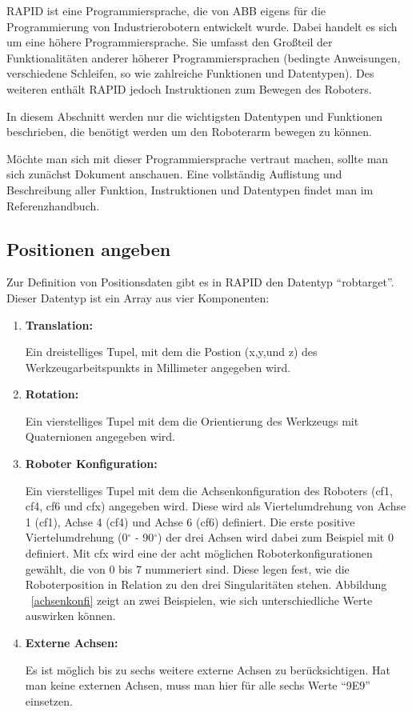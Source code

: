 RAPID ist eine Programmiersprache, die von ABB eigens für die Programmierung von Industrierobotern entwickelt wurde. Dabei handelt es sich um eine höhere Programmiersprache. Sie umfasst den Großteil der Funktionalitäten anderer höherer Programmiersprachen (bedingte Anweisungen, verschiedene Schleifen, so wie zahlreiche Funktionen und Datentypen). Des weiteren enthält RAPID jedoch Instruktionen zum Bewegen des Roboters.

In diesem Abschnitt werden nur die wichtigsten Datentypen und Funktionen beschrieben, die benötigt werden um den Roboterarm bewegen zu können. 

Möchte man sich mit dieser Programmiersprache vertraut machen, sollte man sich zunächst Dokument\cite{rapid1} anschauen. Eine vollständig Auflistung und Beschreibung aller Funktion, Instruktionen und Datentypen findet man im Referenzhandbuch\cite{rapid2}.

\subsection{Positionen angeben}
\label{ropbtargetsection}
Zur Definition von Positionsdaten gibt es in RAPID den Datentyp \enquote{robtarget}. Dieser Datentyp ist ein Array aus vier Komponenten:
\begin{enumerate}
\item \textbf{Translation:}

Ein dreistelliges Tupel, mit dem die Postion (x,y,und z) des Werkzeugarbeitspunkts in Millimeter angegeben wird.
\item \textbf{Rotation:}

Ein vierstelliges Tupel mit dem die Orientierung des Werkzeugs mit Quaternionen angegeben wird.

\item \textbf{Roboter Konfiguration:}

Ein vierstelliges Tupel mit dem die Achsenkonfiguration des Roboters (cf1, cf4, cf6 und cfx) angegeben wird. Diese wird als Viertelumdrehung von Achse 1 (cf1), Achse 4 (cf4) und Achse 6 (cf6) definiert. Die erste positive Viertelumdrehung (0$ ^\circ $ - 90$ ^\circ $) der drei Achsen wird dabei zum Beispiel mit 0 definiert. Mit cfx wird eine der acht möglichen Roboterkonfigurationen gewählt, die von 0 bis 7 nummeriert sind. Diese legen fest, wie die Roboterposition in Relation zu den drei Singularitäten stehen. Abbildung ~\ref{achsenkonfi} zeigt an zwei Beispielen, wie sich unterschiedliche Werte auswirken können.  
\item \textbf{Externe Achsen:}

Es ist möglich bis zu sechs weitere externe Achsen zu berücksichtigen. Hat man keine externen Achsen, muss man hier für alle sechs Werte \enquote{9E9} einsetzen. 
\end{enumerate} 

